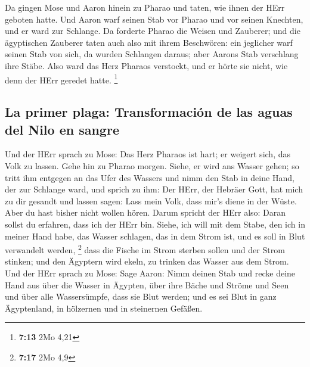  Da gingen Mose und Aaron hinein zu Pharao und taten, wie
ihnen der HErr geboten hatte. Und Aaron warf seinen Stab vor Pharao und
vor seinen Knechten, und er ward zur Schlange.  Da
forderte Pharao die Weisen und Zauberer; und die ägyptischen Zauberer
taten auch also mit ihrem Beschwören:  ein jeglicher warf
seinen Stab von sich, da wurden Schlangen daraus; aber Aarons Stab
verschlang ihre Stäbe.  Also ward das Herz Pharaos
verstockt, und er hörte sie nicht, wie denn der HErr geredet hatte.
\footnote{\textbf{7:13} 2Mo 4,21}

\hypertarget{la-primer-plaga-transformaciuxf3n-de-las-aguas-del-nilo-en-sangre}{%
\subsection{La primer plaga: Transformación de las aguas del Nilo en
sangre}\label{la-primer-plaga-transformaciuxf3n-de-las-aguas-del-nilo-en-sangre}}

 Und der HErr sprach zu Mose: Das Herz Pharaos ist hart;
er weigert sich, das Volk zu lassen.  Gehe hin zu Pharao
morgen. Siehe, er wird ans Wasser gehen; so tritt ihm entgegen an das
Ufer des Wassers und nimm den Stab in deine Hand, der zur Schlange ward,
 und sprich zu ihm: Der HErr, der Hebräer Gott, hat mich
zu dir gesandt und lassen sagen: Lass mein Volk, dass mir's diene in der
Wüste. Aber du hast bisher nicht wollen hören.  Darum
spricht der HErr also: Daran sollst du erfahren, dass ich der HErr bin.
Siehe, ich will mit dem Stabe, den ich in meiner Hand habe, das Wasser
schlagen, das in dem Strom ist, und es soll in Blut verwandelt werden,
\footnote{\textbf{7:17} 2Mo 4,9}  dass die Fische im
Strom sterben sollen und der Strom stinken; und den Ägyptern wird ekeln,
zu trinken das Wasser aus dem Strom.  Und der HErr sprach
zu Mose: Sage Aaron: Nimm deinen Stab und recke deine Hand aus über die
Wasser in Ägypten, über ihre Bäche und Ströme und Seen und über alle
Wassersümpfe, dass sie Blut werden; und es sei Blut in ganz Ägyptenland,
in hölzernen und in steinernen Gefäßen.

